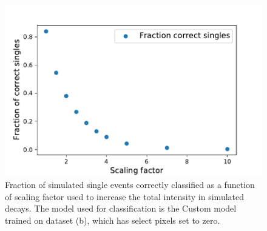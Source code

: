 \begin{figure}
\centering
\includegraphics[width=\textwidth]{chapters/results/figures/simulated_scaled_intensity.pdf}
\caption{\label{fig:simulated-scaled-intensities}Fraction of simulated single events correctly classified
as a function of scaling factor used to increase the total intensity in simulated
decays. The model used for classification is the Custom model trained on dataset (b),
which has select pixels set to zero.}
\end{figure}